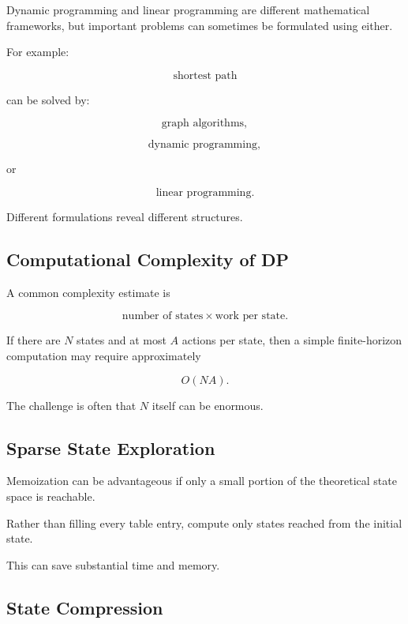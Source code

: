 Dynamic programming and linear programming are different mathematical
frameworks, but important problems can sometimes be formulated using
either.

For example:

\[
\boxed{
\text{shortest path}
}
\]

can be solved by:

\[
\boxed{
\text{graph algorithms},
}
\]

\[
\boxed{
\text{dynamic programming},
}
\]

or

\[
\boxed{
\text{linear programming}.
}
\]

Different formulations reveal different structures.

\subsection{Computational Complexity of DP}
\label{subsec:dynamic-programming-complexity}

A common complexity estimate is

\[
\boxed{
\text{number of states}
\times
\text{work per state}.
}
\]

If there are \(N\) states and at most \(A\) actions per state, then a
simple finite-horizon computation may require approximately

\[
\boxed{
O(NA).
}
\]

The challenge is often that \(N\) itself can be enormous.

\subsection{Sparse State Exploration}
\label{subsec:sparse-state-exploration}

Memoization can be advantageous if only a small portion of the theoretical
state space is reachable.

Rather than filling every table entry, compute only states reached from
the initial state.

This can save substantial time and memory.

\subsection{State Compression}
\label{subsec:state-compression}


